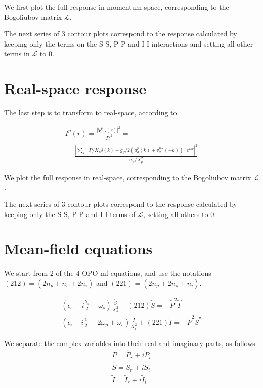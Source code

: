 \documentclass[a4paper,prb,10pt,aps,twocolumn]{revtex4-1}
\begin{document}
We first plot the full response in momentum-space, corresponding to the
Bogoliubov matrix $\mathcal{L}$.

The next series of 3 contour plots correspond to the response calculated
by keeping only the terms on the S-S, P-P and I-I interactions and
setting all other terms in $\mathcal{L}$ to 0.


\section{Real-space response}
The last step is to transform to real-space, according to

\begin{multline}
  \label{eq:11}
I^{p}(r)=\frac{\vert\Psi_{\text{LP}}^{p}(r)\vert^{2}}{\vert P\vert^{2}}=\\
=\frac{\left|\sum_{k}\left[\tilde{P}/X_{p}\delta(k)+g_V/2\left(u_{d}^{p}(k)+v_{d}^{p\star}(-k)\right)\right]e^{ikr}\right|^{2}}{n_p/X_p^2}
\end{multline}

We plot the full response in real-space, corresponding to the Bogoliubov
matrix $\mathcal{L}$.

The next series of 3 contour plots correspond to the response calculated
by keeping only the S-S, P-P and I-I terms of $\mathcal{L}$,
setting all others to 0.

\section{Mean-field equations}
We start from 2 of the 4 OPO mf equations, and use the notations $\left(212\right)=\left(2n_{p}+n_{s}+2n_{i}\right)$ and $\left(221\right)=\left(2n_{p}+2n_{s}+n_{i}\right)$. 

\begin{subequations}
  \begin{eqnarray}
    \label{eq:15}
\left(\epsilon_{s}-i\frac{\gamma_{s}}{2}-\omega_{s}\right)\frac{\tilde{S}}{X_{s}^{2}}+(212)\tilde{S}=-\tilde{P}^{2}\tilde{I}^{\star}\\
\left(\epsilon_{i}-i\frac{\gamma_{i}}{2}-2\omega_{p}+\omega_{s}\right)\frac{\tilde{I}}{X_{i}^{2}}+(221)\tilde{I}=-\tilde{P}^{2}\tilde{S}^{\star}
  \end{eqnarray}
\end{subequations}

We separate the complex variables into their real and imaginary parts, as follows
\begin{subequations}
  \begin{eqnarray}
    \label{eq:13}
\tilde{P}=\tilde{P}_{r}+i\tilde{P}_{i}\\
\tilde{S}=\tilde{S}_{r}+i\tilde{S}_{i}\\
\tilde{I}=\tilde{I}_{r}+i\tilde{I}_{i}
  \end{eqnarray}
\end{subequations}
\end{document}
